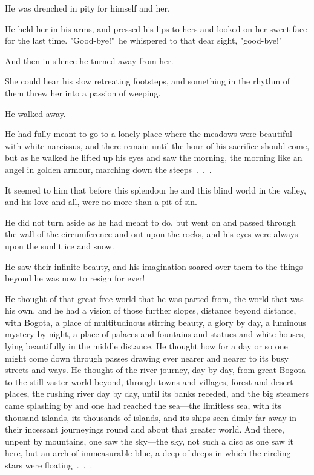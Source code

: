 \documentclass[courier]{sffms}
\begin{document}
He was drenched in pity for himself and her.

He held her in his arms, and pressed his lips to hers and looked on
her sweet face for the last time. "Good-bye!"\ he whispered to that
dear sight, "good-bye!"

And then in silence he turned away from her.

She could hear his slow retreating footsteps, and something in the
rhythm of them threw her into a passion of weeping.

He walked away.

He had fully meant to go to a lonely place where the meadows were
beautiful with white narcissus, and there remain until the hour of his
sacrifice should come, but as he walked he lifted up his eyes and saw
the morning, the morning like an angel in golden armour, marching down
the steeps~.~.~.

It seemed to him that before this splendour he and this blind world in
the valley, and his love and all, were no more than a pit of sin.

He did not turn aside as he had meant to do, but went on and passed
through the wall of the circumference and out upon the rocks, and his
eyes were always upon the sunlit ice and snow.

He saw their infinite beauty, and his imagination soared over them to
the things beyond he was now to resign for ever!

He thought of that great free world that he was parted from, the world
that was his own, and he had a vision of those further slopes,
distance beyond distance, with Bogota, a place of multitudinous
stirring beauty, a glory by day, a luminous mystery by night, a place
of palaces and fountains and statues and white houses, lying
beautifully in the middle distance. He thought how for a day or so one
might come down through passes drawing ever nearer and nearer to its
busy streets and ways. He thought of the river journey, day by day,
from great Bogota to the still vaster world beyond, through towns and
villages, forest and desert places, the rushing river day by day,
until its banks receded, and the big steamers came splashing by and
one had reached the sea---the limitless sea, with its thousand islands,
its thousands of islands, and its ships seen dimly far away in their
incessant journeyings round and about that greater world. And there,
unpent by mountains, one saw the sky---the sky, not such a disc as one
saw it here, but an arch of immeasurable blue, a deep of deeps in
which the circling stars were floating~.~.~.
\end{document}
